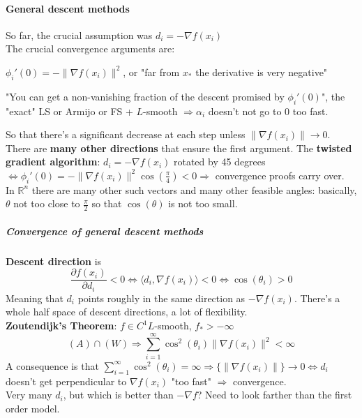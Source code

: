 \documentclass[10pt]{report}
\begin{document}
\paragraph{General descent methods} So far, the crucial assumption was $d_i = -\nabla f(x_i)$\\
The crucial convergence arguments are:
\begin{list}{}{}
	\item $\phi_i'(0) = -\|\nabla f(x_i)\|^2$, or "far from $x_*$ the derivative is very negative"
	\item "You can get a non-vanishing fraction of the descent promised by $\phi_i'(0)$", the "exact" LS or Armijo or FS + $L$-smooth $\Rightarrow \alpha_i$ doesn't not go to 0 too fast.
\end{list}
So that there's a significant decrease at each step unless $\|\nabla f(x_i)\|\rightarrow 0$.\\
There are \textbf{many other directions} that ensure the first argument. The \textbf{twisted gradient algorithm}: $d_i = -\nabla f(x_i)$ rotated by 45 degrees $\Leftrightarrow \phi_i'(0) = -\|\nabla f(x_i)\|^2\cos(\frac{\pi}{4}) < 0 \Rightarrow$ convergence proofs carry over.\\
In $\mathbb{R}^n$ there are many other such vectors and many other feasible angles: basically, $\theta$ not too close to $\frac{\pi}{2}$ so that $\cos(\theta)$ is not too small.
\subparagraph{Convergence of general descent methods} \textbf{Descent direction} is $$\frac{\partial f(x_i)}{\partial d_i} < 0 \Leftrightarrow \langle d_i,\nabla f(x_i)\rangle < 0 \Leftrightarrow \cos(\theta_i) > 0$$ Meaning that $d_i$ points roughly in the same direction as $-\nabla f(x_i)$. There's a whole half space of descent directions, a lot of flexibility.\\
\textbf{Zoutendijk's Theorem}: $f\in C^1 L$-smooth, $f_*>-\infty$ $$(A)\cap(W)\Rightarrow\sum_{i=1}^\infty\cos^2(\theta_i)\|\nabla f(x_i)\|^2<\infty$$
A consequence is that $\sum_{i=1}^\infty\cos^2(\theta_i) = \infty \Rightarrow \{\|\nabla f(x_i)\|\}\rightarrow 0 \Leftrightarrow d_i$ doesn't get perpendicular to $\nabla f(x_i)$ "too fast" $\Rightarrow$ convergence.\\
Very many $d_i$, but which is better than $-\nabla f$? Need to look farther than the first order model.
\end{document}
